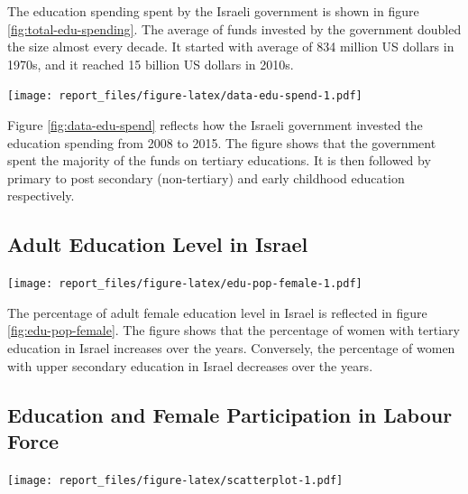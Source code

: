\documentclass[11pt,a4paper,]{article}
\let\origfigure\figure
\let\endorigfigure\endfigure
\renewenvironment{figure}[1][2] {
    \expandafter\origfigure\expandafter[H]
} {
    \endorigfigure
}%
\begin{document}
The education spending spent by the Israeli government is shown in figure \ref{fig:total-edu-spending}. The average of funds invested by the government doubled the size almost every decade. It started with average of 834 million US dollars in 1970s, and it reached 15 billion US dollars in 2010s.

\begin{figure}
\centering
\texttt{[image: report\_files/figure-latex/data-edu-spend-1.pdf]}
\caption{\label{fig:data-edu-spend}Education Spending in Israel}
\end{figure}

Figure \ref{fig:data-edu-spend} reflects how the Israeli government invested the education spending from 2008 to 2015. The figure shows that the government spent the majority of the funds on tertiary educations. It is then followed by primary to post secondary (non-tertiary) and early childhood education respectively.

\subsection*{Adult Education Level in Israel}

\begin{figure}
\centering
\texttt{[image: report\_files/figure-latex/edu-pop-female-1.pdf]}
\caption{\label{fig:edu-pop-female}Female Adult Education Level in Israel}
\end{figure}

The percentage of adult female education level in Israel is reflected in figure \ref{fig:edu-pop-female}. The figure shows that the percentage of women with tertiary education in Israel increases over the years. Conversely, the percentage of women with upper secondary education in Israel decreases over the years.

\subsection*{Education and Female Participation in Labour Force}

\begin{figure}
\centering
\texttt{[image: report\_files/figure-latex/scatterplot-1.pdf]}
\caption{\label{fig:scatterplot}Scatterplot of Female Labour Participation Ratio and Adult Women Education Level}
\end{figure}
\end{document}
